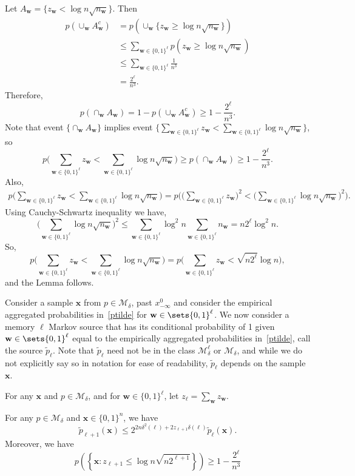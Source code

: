 \documentclass[conference,a4paper]{article}
\newcommand{\x}{\textbf{x}}
\newcommand{\w}{\textbf{w}}
\newcommand{\M}{\mathcal{M}}
\begin{document}
Let $A_\w=\{z_\w<\log n\sqrt{n_\w}\}$. Then 
\begin{align*}
p(\cup_\w A_\w^c)&=p (\cup_\w\{ z_\w\geq\log n\sqrt{n_\w}\})\\
&\leq\sum_{\w\in\{0,1\}^{\ell}} p(z_\w\geq\log n\sqrt{n_\w})\\
&\leq \sum_{\w\in\{0,1\}^{\ell}} \frac{1}{n^3}\\
&=\frac{2^\ell}{n^3}.
\end{align*}
Therefore, 
\[
p(\cap_{\w} A_\w)=1-p(\cup_\w A^c_\w)\geq 1-\frac{2^\ell}{n^3}.
\]
Note that event $\{\cap_{\w} A_\w\}$ implies event $\{\sum_{\w\in\{0,1\}^{\ell}} z_\w<\sum_{\w\in\{0,1\}^{\ell}} \log n\sqrt{n_\w}\}$, so 
\[
 p\bigg(\sum_{\w\in\{0,1\}^{\ell}} z_\w<\sum_{\w\in\{0,1\}^{\ell}} \log n\sqrt{n_\w}\bigg)\geq p (\cap_{\w} A_\w)\geq 1-\frac{2^\ell}{n^3}.
\]
Also, 
\begin{align*}
 p\bigg(\sum_{\w\in\{0,1\}^{\ell}} z_\w<\sum_{\w\in\{0,1\}^{\ell}} \log n\sqrt{n_\w}\bigg)
=p\bigg(\bigg(\sum_{\w\in\{0,1\}^{\ell}} z_\w\bigg)^2< \big(\sum_{\w\in\{0,1\}^{\ell}} \log n\sqrt{n_\w}\big)^2\bigg).
\end{align*}
Using Cauchy-Schwartz inequality we have,
\[
\bigg(\sum_{\w\in\{0,1\}^{\ell}} \log n\sqrt{n_\w}\bigg)^2\leq \sum_{\w\in\{0,1\}^{\ell}} \log^2n\sum_{\w\in\{0,1\}^{\ell}} n_\w=n2^\ell\log^2 n.
\]
So,
\[
 p\bigg(\sum_{\w\in\{0,1\}^{\ell}} z_\w<\sum_{\w\in\{0,1\}^{\ell}} \log n\sqrt{n_\w}\bigg)
 =  p\bigg(\sum_{\w\in\{0,1\}^{\ell}} z_\w< \sqrt{n2^\ell}\log n\bigg),
\]
and the Lemma follows. 
\eLemma

Consider a sample $\x$ from $p\in\M_\delta$, past $x^0_{-\infty}$ and
consider the empirical aggregated probabilities in~\eqref{ptilde} for
$\w\in\sets{0,1}^\ell$. We now consider a memory $\ell$ Markov source
that has its conditional probability of 1 given $\w\in\sets{0,1}^\ell$
equal to the empirically aggregated probabilities in~\eqref{ptilde},
call the source $\tilde{p}_\ell$.  Note that $\tilde{p}_\ell$ need not
be in the class $\M_\delta^\ell$ or $\M_\delta$, and while we do not
explicitly say so in notation for ease of readability,
$\tilde{p}_\ell$ depends on the sample $\x$.


For any $\x$ and $p\in\M_\delta$, and for $\w\in\{0,1\}^{\ell}$, let $z_{\ell}=\sum_{\w}z_{\w}$.

\bLemma
\label{lm18}
For any $p\in \M_{\delta}$ and $\x\in\{0,1\}^{n}$, we have 
$$\tilde{p}_{\ell+1}(\x)\le 2^{2n\delta^2(\ell)+2z_{\ell+1}\delta(\ell)}\tilde{p}_{\ell}(\x).$$
Moreover, we have
\[
p\left(\left\{\x:z_{\ell+1}\le 
\log n\sqrt{n2^{\ell+1}}\right\}\right)\ge 1-\frac{2^{\ell}}{n^3}
\]
\Proof 
\end{document}

